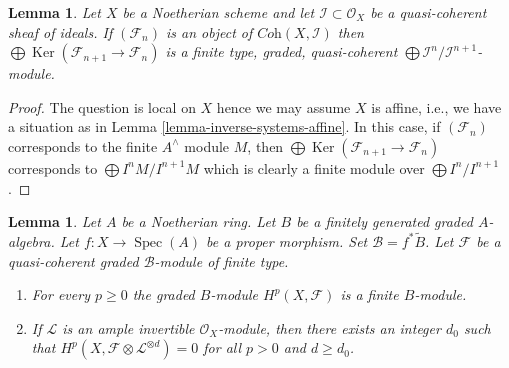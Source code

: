\documentclass{amsart}
\theoremstyle{plain}
\newtheorem{lemma}[subsection]{Lemma}
\theoremstyle{definition}
\theoremstyle{remark}
\numberwithin{equation}{subsection}
\def\Spec{\mathop{\mathrm{Spec}}}
\def\Ker{\mathop{\mathrm{Ker}}}
\begin{document}
\begin{lemma}
\label{lemma-finite-over-rees-algebra}
Let $X$ be a Noetherian scheme and let $\mathcal{I} \subset \mathcal{O}_X$
be a quasi-coherent sheaf of ideals. If $(\mathcal{F}_n)$ is an object of
$\textit{Coh}(X, \mathcal{I})$ then
$\bigoplus \Ker(\mathcal{F}_{n + 1} \to \mathcal{F}_n)$ is
a finite type, graded, quasi-coherent
$\bigoplus \mathcal{I}^n/\mathcal{I}^{n + 1}$-module.
\end{lemma}

\begin{proof}
The question is local on $X$ hence we may assume $X$ is affine, i.e.,
we have a situation as in Lemma \ref{lemma-inverse-systems-affine}.
In this case, if $(\mathcal{F}_n)$ corresponds to the finite $A^\wedge$
module $M$, then $\bigoplus \Ker(\mathcal{F}_{n + 1} \to \mathcal{F}_n)$
corresponds to $\bigoplus I^nM/I^{n + 1}M$ which is clearly a finite
module over $\bigoplus I^n/I^{n + 1}$.
\end{proof}


\begin{lemma}
\label{lemma-graded-finiteness}
Let $A$ be a Noetherian ring.
Let $B$ be a finitely generated graded $A$-algebra.
Let $f : X \to \Spec(A)$ be a proper morphism.
Set $\mathcal{B} = f^*\widetilde B$.
Let $\mathcal{F}$ be a quasi-coherent
graded $\mathcal{B}$-module of finite type.
\begin{enumerate}
\item For every $p \geq 0$ the graded $B$-module $H^p(X, \mathcal{F})$
is a finite $B$-module.
\item If $\mathcal{L}$ is an ample invertible $\mathcal{O}_X$-module,
then there exists an integer $d_0$ such that
$H^p(X, \mathcal{F} \otimes \mathcal{L}^{\otimes d}) = 0$
for all $p > 0$ and $d \geq d_0$.
\end{enumerate}
\end{lemma}
\end{document}
